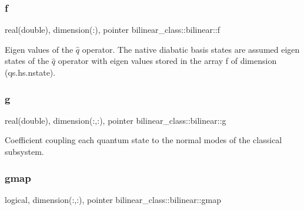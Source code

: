 \mbox{\label{structbilinear__class_1_1bilinear_a809699845e36e344b7aeb51642c333ec}} 
\subsubsection{\texorpdfstring{f}{f}}
{\footnotesize\ttfamily real(double), dimension(\+:), pointer bilinear\+\_\+class\+::bilinear\+::f\hspace{0.3cm}{\ttfamily [private]}}



Eigen values of the $ \hat q $ operator. The native diabatic basis states are assumed eigen states of the $ \hat q $ operator with eigen values stored in the array f of dimension (qs.\+hs.\+nstate). 

\mbox{\label{structbilinear__class_1_1bilinear_a910401429e7649dba49acbab872a1b75}} 
\subsubsection{\texorpdfstring{g}{g}}
{\footnotesize\ttfamily real(double), dimension(\+:,\+:), pointer bilinear\+\_\+class\+::bilinear\+::g\hspace{0.3cm}{\ttfamily [private]}}



Coefficient coupling each quantum state to the normal modes of the classical subsystem. 

\mbox{\label{structbilinear__class_1_1bilinear_aeb06e78f97c5cdac0c83422ec087e2e0}} 
\subsubsection{\texorpdfstring{gmap}{gmap}}
{\footnotesize\ttfamily logical, dimension(\+:,\+:), pointer bilinear\+\_\+class\+::bilinear\+::gmap\hspace{0.3cm}{\ttfamily [private]}}

